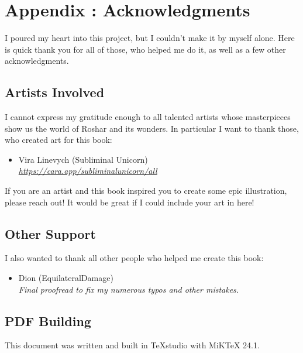 \chapter{Appendix \thechapter{}: Acknowledgments}
\label{chap:acknowledgments}

I poured my heart into this project, but I couldn't make it by myself alone. Here is quick thank you for all of those, who helped me do it, as well as a few other acknowledgments. 

\section{Artists Involved}

I cannot express my gratitude enough to all talented artists whose masterpieces show us the world of Roshar and its wonders. In particular I want to thank those, who created art for this book:

\begin{itemize}
	\item Vira Linevych (Subliminal Unicorn) \\
	\textit{\url{https://cara.app/subliminalunicorn/all}}
\end{itemize}

If you are an artist and this book inspired you to create some epic illustration, please reach out! It would be great if I could include your art in here!

\section{Other Support}

I also wanted to thank all other people who helped me create this book:

\begin{itemize}
	\item Dion (EquilateralDamage) \\
	\textit{Final proofread to fix my numerous typos and other mistakes.} 
\end{itemize}


\section{PDF Building} 

This document was written and built in TeXstudio with MiKTeX 24.1.

